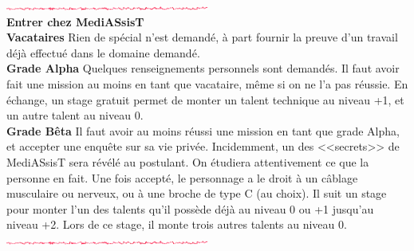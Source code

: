 \documentclass[11pt,twoside,a4paper]{article}
\def\barreCyberAgeHalf{\includegraphics[width=0.50\textwidth]{img/Filet_CA.png}}
\begin{document}
\begin{multicols}{2}
\barreCyberAgeHalf ~\\

\textbf{\large Entrer chez MediASsisT}~\\
\textbf{Vacataires} Rien de sp{\'e}cial n'est demand{\'e}, {\`a} part fournir la preuve d'un travail d{\'e}j{\`a} effectu{\'e} dans le domaine demand{\'e}. ~\\
\textbf{Grade Alpha} Quelques renseignements personnels sont demand{\'e}s. Il faut avoir fait une mission au moins en tant que vacataire, m{\^e}me si on ne l'a pas r{\'e}ussie. En {\'e}change, un stage gratuit permet de monter un talent technique au niveau +1, et un autre talent au niveau 0. ~\\
\textbf{Grade B{\^e}ta} Il faut avoir au moins r{\'e}ussi une mission en tant que grade Alpha, et accepter une enqu{\^e}te sur sa vie priv{\'e}e. Incidemment, un des <<secrets>> de \mbox{MediASsisT} sera r{\'e}v{\'e}l{\'e} au postulant. On {\'e}tudiera attentivement ce que la personne en fait. Une fois accept{\'e}, le personnage a le droit {\`a} un c{\^a}blage musculaire ou nerveux, ou {\`a} une broche de type C (au choix). Il suit un stage pour monter l'un des talents qu'il poss{\`e}de d{\'e}j{\`a} au niveau 0 ou +1 jusqu'au niveau +2. Lors de ce stage, il monte trois autres talents au niveau 0. ~\\

\barreCyberAgeHalf ~\\

\end{multicols}

\clearpage
\end{document}
